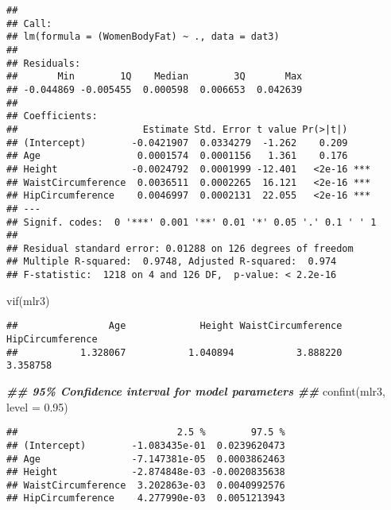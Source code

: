 \documentclass[
]{article}
\newenvironment{Shaded}{\begin{snugshade}}{\end{snugshade}}
\newcommand{\AttributeTok}[1]{\textcolor[rgb]{0.77,0.63,0.00}{#1}}
\newcommand{\DocumentationTok}[1]{\textcolor[rgb]{0.56,0.35,0.01}{\textbf{\textit{#1}}}}
\newcommand{\FloatTok}[1]{\textcolor[rgb]{0.00,0.00,0.81}{#1}}
\newcommand{\FunctionTok}[1]{\textcolor[rgb]{0.00,0.00,0.00}{#1}}
\newcommand{\NormalTok}[1]{#1}
\newcommand{\SpecialCharTok}[1]{\textcolor[rgb]{0.00,0.00,0.00}{#1}}
\newcommand{\StringTok}[1]{\textcolor[rgb]{0.31,0.60,0.02}{#1}}
\begin{document}
\begin{verbatim}
## 
## Call:
## lm(formula = (WomenBodyFat) ~ ., data = dat3)
## 
## Residuals:
##       Min        1Q    Median        3Q       Max 
## -0.044869 -0.005455  0.000598  0.006653  0.042639 
## 
## Coefficients:
##                      Estimate Std. Error t value Pr(>|t|)    
## (Intercept)        -0.0421907  0.0334279  -1.262    0.209    
## Age                 0.0001574  0.0001156   1.361    0.176    
## Height             -0.0024792  0.0001999 -12.401   <2e-16 ***
## WaistCircumference  0.0036511  0.0002265  16.121   <2e-16 ***
## HipCircumference    0.0046997  0.0002131  22.055   <2e-16 ***
## ---
## Signif. codes:  0 '***' 0.001 '**' 0.01 '*' 0.05 '.' 0.1 ' ' 1
## 
## Residual standard error: 0.01288 on 126 degrees of freedom
## Multiple R-squared:  0.9748, Adjusted R-squared:  0.974 
## F-statistic:  1218 on 4 and 126 DF,  p-value: < 2.2e-16
\end{verbatim}

\begin{Shaded}
\begin{Highlighting}[]
\FunctionTok{vif}\NormalTok{(mlr3)}
\end{Highlighting}
\end{Shaded}

\begin{verbatim}
##                Age             Height WaistCircumference   HipCircumference 
##           1.328067           1.040894           3.888220           3.358758
\end{verbatim}

\begin{Shaded}
\begin{Highlighting}[]
\DocumentationTok{\#\# 95\% Confidence interval for model parameters \#\#}
\FunctionTok{confint}\NormalTok{(mlr3, }\AttributeTok{level =} \FloatTok{0.95}\NormalTok{)}
\end{Highlighting}
\end{Shaded}

\begin{verbatim}
##                            2.5 %        97.5 %
## (Intercept)        -1.083435e-01  0.0239620473
## Age                -7.147381e-05  0.0003862463
## Height             -2.874848e-03 -0.0020835638
## WaistCircumference  3.202863e-03  0.0040992576
## HipCircumference    4.277990e-03  0.0051213943
\end{verbatim}

\begin{Shaded}
\end{Shaded}
\end{document}
